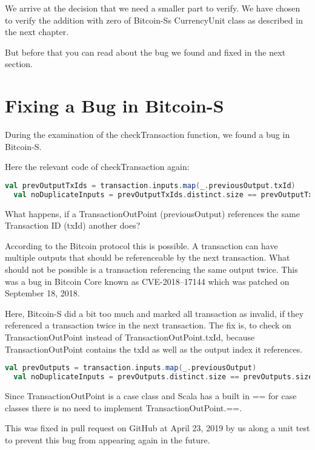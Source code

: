 We arrive at the decision that we need a smaller part to verify.
We have chosen to verify the addition with zero of Bitcoin-Ss CurrencyUnit class as described in the next chapter.

But before that you can read about the bug we found and fixed in the next section.


\section{Fixing a Bug in Bitcoin-S}

During the examination of the checkTransaction function, we found a bug in Bitcoin-S.

Here the relevant code of checkTransaction again:
\begin{lstlisting}[language=scala]
  val prevOutputTxIds = transaction.inputs.map(_.previousOutput.txId)
  val noDuplicateInputs = prevOutputTxIds.distinct.size == prevOutputTxIds.size
\end{lstlisting}

What happens, if a TransactionOutPoint (previousOutput) references the same Transaction ID (txId) another does?

According to the Bitcoin protocol this is possible.
A transaction can have multiple outputs that should be referenceable by the next transaction.
What should not be possible is a transaction referencing the same output twice.
This was a bug in Bitcoin Core known as CVE-2018–17144 which was patched on September 18, 2018.

Here, Bitcoin-S did a bit too much and marked all transaction as invalid, if they referenced a transaction twice in the next transaction.
The fix is, to check on TransactionOutPoint instead of TransactionOutPoint.txId, because TransactionOutPoint contains the txId as well as the output index it references.
\begin{lstlisting}[language=scala]
  val prevOutputs = transaction.inputs.map(_.previousOutput)
  val noDuplicateInputs = prevOutputs.distinct.size == prevOutputs.size
\end{lstlisting}
Since TransactionOutPoint is a case class and Scala has a built in == for case classes there is no need to implement TransactionOutPoint.==.

This was fixed in pull request  on GitHub at April 23, 2019 by us along a unit test to prevent this bug from appearing again in the future.
